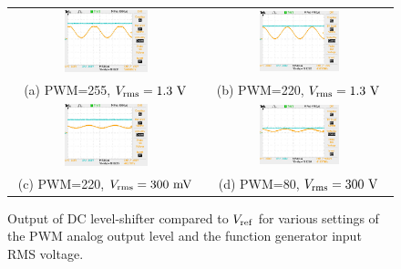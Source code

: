 \documentclass[12pt]{article}
\begin{document}
\begin{figure}[htbp]
\begin{center}
\begin{tabular}{cc}
{\includegraphics[width=0.45\textwidth]{figs/pwm255_1_3Vrms.JPG}} &
{\includegraphics[width=0.45\textwidth]{figs/pwm220_1_3Vrms.JPG}} \\
(a) PWM=255, $V_{\rm rms}=1.3~\rm V$ & (b) PWM=220, $V_{\rm rms}=1.3~\rm V$ \\
{\includegraphics[width=0.45\textwidth]{figs/pwm220_300mVrms.JPG}} &
{\includegraphics[width=0.45\textwidth]{figs/pwm80_300mVrms.JPG}} \\
(c) PWM=220, $V_{\rm rms}=300~\rm mV$ & (d) PWM=80, $V_{\rm rms}=300~\rm V$ \\
\end{tabular}
\end{center}
\caption{\label{fig:pwmdemo}  Output of DC level-shifter compared to $V_{\rm ref}$ for various settings of the PWM analog output level and the function generator input RMS voltage.
}
\end{figure}
\end{document}
